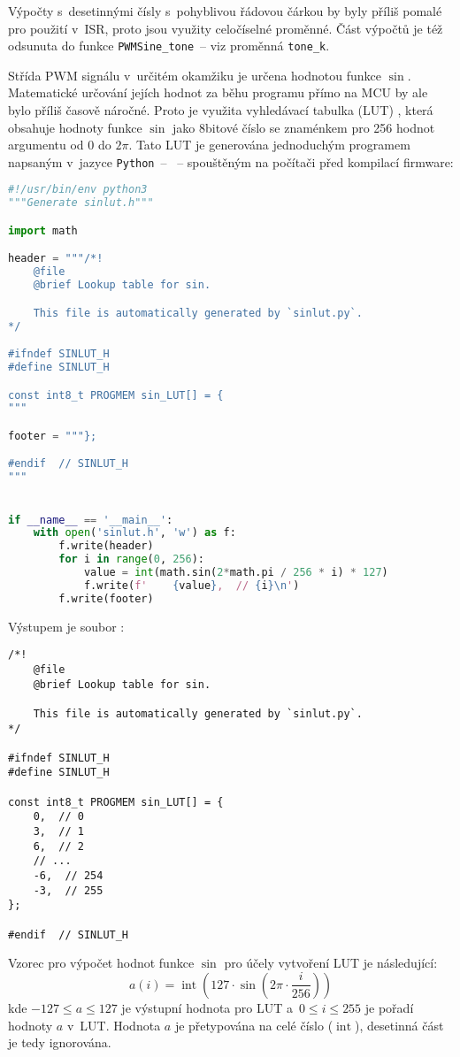 Výpočty s~desetinnými čísly s~pohyblivou řádovou čárkou by byly příliš pomalé
pro použití v~ISR, proto jsou využity celočíselné proměnné. Část
výpočtů je též odsunuta do funkce \verb|PWMSine_tone|~-- viz proměnná
\verb|tone_k|.

Střída PWM signálu v~určitém okamžiku je určena hodnotou funkce $\sin$.
Matematické určování jejích hodnot za běhu programu přímo na MCU by ale bylo
příliš časově náročné. Proto je využita vyhledávací tabulka (\acs{LUT})
, která obsahuje hodnoty funkce $\sin$ jako 8bitové číslo se
znaménkem pro 256 hodnot argumentu od $0$ do $2\pi$. Tato LUT je generována
jednoduchým programem napsaným v~jazyce \texttt{Python}~--
~-- spouštěným na počítači před kompilací firmware:
\begin{lstlisting}[language=Python,style=numbers]
#!/usr/bin/env python3
"""Generate sinlut.h"""

import math

header = """/*!
    @file
    @brief Lookup table for sin.

    This file is automatically generated by `sinlut.py`.
*/

#ifndef SINLUT_H
#define SINLUT_H

const int8_t PROGMEM sin_LUT[] = {
"""

footer = """};

#endif  // SINLUT_H
"""


if __name__ == '__main__':
    with open('sinlut.h', 'w') as f:
        f.write(header)
        for i in range(0, 256):
            value = int(math.sin(2*math.pi / 256 * i) * 127)
            f.write(f'    {value},  // {i}\n')
        f.write(footer)
\end{lstlisting}

Výstupem je soubor :
\begin{lstlisting}[language=myC++,style=numbers]
/*!
    @file
    @brief Lookup table for sin.

    This file is automatically generated by `sinlut.py`.
*/

#ifndef SINLUT_H
#define SINLUT_H

const int8_t PROGMEM sin_LUT[] = {
    0,  // 0
    3,  // 1
    6,  // 2
    // ...
    -6,  // 254
    -3,  // 255
};

#endif  // SINLUT_H
\end{lstlisting}

Vzorec pro výpočet hodnot funkce $\sin$ pro účely vytvoření LUT je následující:
\begin{equation}
    a(i) = \operatorname{int}\left( \num{127}\cdot\sin{\left(2\pi \cdot \frac{i}{256}\right)} \right)
\end{equation}
kde $\num{-127} \le a \le \num{127}$ je výstupní hodnota pro LUT
a~$\num{0} \le i \le \num{255}$ je pořadí hodnoty $a$ v~LUT. Hodnota $a$ je
přetypována na celé číslo ($\operatorname{int}$), desetinná část je tedy
ignorována.

